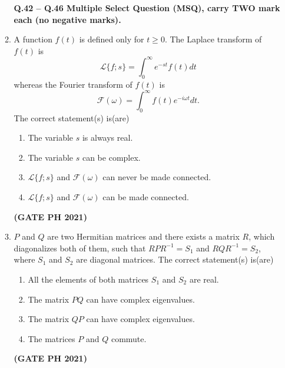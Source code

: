 \documentclass[14pt, a4paper]{extarticle}
\begin{document}
\begin{enumerate}[label=\textbf{Q.\arabic*}]
\begin{enumerate}[label=\textbf{Q.\arabic*}]
\textbf{Q.42 – Q.46 Multiple Select Question (MSQ), carry TWO mark each (no negative marks).}

\item A function $f(t)$ is defined only for $t \geq 0$. The Laplace transform of $f(t)$ is
$$ \mathcal{L}\{f;s\} = \int_0^{\infty} e^{-st} f(t) dt $$
whereas the Fourier transform of $f(t)$ is
$$ \mathcal{F}(\omega) = \int_0^{\infty} f(t) e^{-i\omega t} dt. $$
The correct statement(s) is(are)
\begin{enumerate}
\item The variable $s$ is always real.
\item The variable $s$ can be complex.
\item $\mathcal{L}\{f;s\}$ and $\mathcal{F}(\omega)$ can never be made connected.
\item $\mathcal{L}\{f;s\}$ and $\mathcal{F}(\omega)$ can be made connected.
\end{enumerate}
\hfill \textbf{(GATE PH 2021)}

\item $P$ and $Q$ are two Hermitian matrices and there exists a matrix $R$, which diagonalizes both of them, such that $RPR^{-1}=S_1$ and $RQR^{-1}=S_2$, where $S_1$ and $S_2$ are diagonal matrices. The correct statement(s) is(are)
\begin{enumerate}
\item All the elements of both matrices $S_1$ and $S_2$ are real.
\item The matrix $PQ$ can have complex eigenvalues.
\item The matrix $QP$ can have complex eigenvalues.
\item The matrices $P$ and $Q$ commute.
\end{enumerate}
\hfill \textbf{(GATE PH 2021)}


\end{enumerate}
\end{enumerate}
\end{document}
